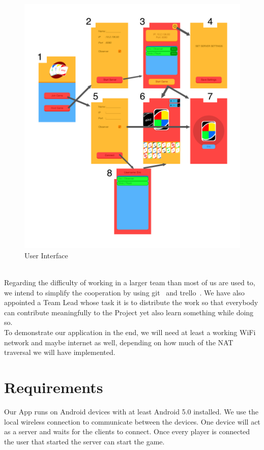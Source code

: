 \documentclass{report}
\newcommand{\lfig}[1]{\label{fig:#1}}
\begin{document}
\begin{figure}[h]
	\centering
    \includegraphics[width=\columnwidth]{Artboard.png}
    \vspace{-5mm} %
	\caption{User Interface}
	    \lfig{artboard}
\end{figure}
\\

Regarding the difficulty of working in a larger team than most of us are used to, we intend to simplify the cooperation by using git~\cite{github} and trello~\cite{trello}. We have also appointed a Team Lead whose task it is to distribute the work so that everybody can contribute meaningfully to the Project yet also learn something while doing so.\\

To demonstrate our application in the end, we will need at least a working WiFi network and maybe internet as well, depending on how much of the NAT traversal we will have implemented.
\newline
\newline


\section{Requirements}
Our App runs on Android devices with at least Android 5.0 installed. We use the local wireless connection to communicate between the devices. One device will act as a server and waits for the clients to connect. Once every player is connected the user that started the server can start the game.
\end{document}
